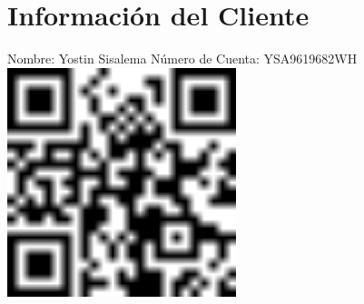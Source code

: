 \documentclass[a4paper]{article}
\begin{document}
\section*{Información del Cliente}
Nombre: Yostin Sisalema
Número de Cuenta: YSA9619682WH
\vspace{1cm}
\includegraphics[width=0.5\textwidth]{qr_YSA9619682WH.png}
\end{document}

